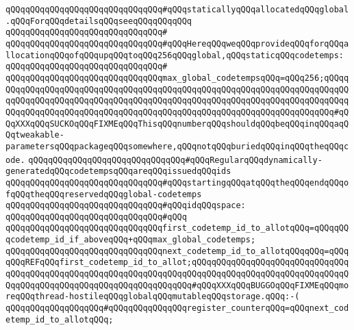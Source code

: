 \verb|qQQqqQQqqQQqqQQqqQQqqQQqqQQqqQQq#qQQqstaticallyqQQqallocatedqQQqglobal.qQQqForqQQqdetailsqQQqseeqQQqqQQqqQQq|\newline
\verb|qQQqqQQqqQQqqQQqqQQqqQQqqQQqqQQq#|\newline
\verb|qQQqqQQqqQQqqQQqqQQqqQQqqQQqqQQq#qQQqHereqQQqweqQQqprovideqQQqforqQQqallocationqQQqofqQQqupqQQqtoqQQq256qQQqglobal,qQQqstaticqQQqcodetemps:|\newline
\verb|qQQqqQQqqQQqqQQqqQQqqQQqqQQqqQQq#|\newline
\verb|qQQqqQQqqQQqqQQqqQQqqQQqqQQqqQQqmax_global_codetempsqQQq=qQQq256;qQQqqQQqqQQqqQQqqQQqqQQqqQQqqQQqqQQqqQQqqQQqqQQqqQQqqQQqqQQqqQQqqQQqqQQqqQQqqQQqqQQqqQQqqQQqqQQqqQQqqQQqqQQqqQQqqQQqqQQqqQQqqQQqqQQqqQQqqQQqqQQqqQQqqQQqqQQqqQQqqQQqqQQqqQQqqQQqqQQqqQQqqQQqqQQqqQQqqQQqqQQqqQQqqQQq#qQQqXXXqQQqSUCKOqQQqFIXMEqQQqThisqQQqnumberqQQqshouldqQQqbeqQQqinqQQqaqQQqtweakable-parametersqQQqpackageqQQqsomewhere,qQQqnotqQQqburiedqQQqinqQQqtheqQQqcode.|\newline
\newline
\verb|qQQqqQQqqQQqqQQqqQQqqQQqqQQqqQQq#qQQqRegularqQQqdynamically-generatedqQQqcodetempsqQQqareqQQqissuedqQQqids|\newline
\verb|qQQqqQQqqQQqqQQqqQQqqQQqqQQqqQQq#qQQqstartingqQQqatqQQqtheqQQqendqQQqofqQQqtheqQQqreservedqQQqglobal-codetemps|\newline
\verb|qQQqqQQqqQQqqQQqqQQqqQQqqQQqqQQq#qQQqidqQQqspace:|\newline
\verb|qQQqqQQqqQQqqQQqqQQqqQQqqQQqqQQq#qQQq|\newline
\verb|qQQqqQQqqQQqqQQqqQQqqQQqqQQqqQQqfirst_codetemp_id_to_allotqQQq=qQQqqQQqcodetemp_id_if_aboveqQQq+qQQqmax_global_codetemps;|\newline
\verb|qQQqqQQqqQQqqQQqqQQqqQQqqQQqqQQqnext_codetemp_id_to_allotqQQqqQQq=qQQqqQQqREFqQQqfirst_codetemp_id_to_allot;qQQqqQQqqQQqqQQqqQQqqQQqqQQqqQQqqQQqqQQqqQQqqQQqqQQqqQQqqQQqqQQqqQQqqQQqqQQqqQQqqQQqqQQqqQQqqQQqqQQqqQQqqQQqqQQqqQQqqQQqqQQqqQQqqQQqqQQqqQQq#qQQqXXXqQQqBUGGOqQQqFIXMEqQQqmoreqQQqthread-hostileqQQqglobalqQQqmutableqQQqstorage.qQQq:-(|\newline
\newline
\verb|qQQqqQQqqQQqqQQqqQQq#qQQqqQQqqQQqqQQqregister_counterqQQq=qQQqnext_codetemp_id_to_allotqQQq;|\newline
\newline
